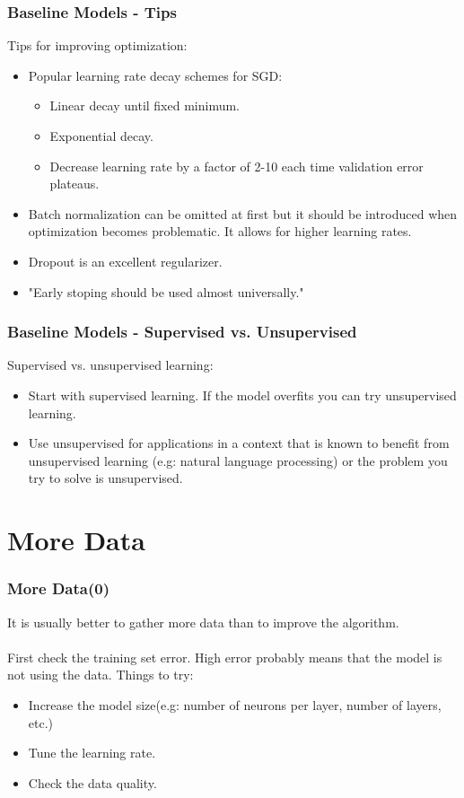 \documentclass{beamer}
\begin{document}
\begin{frame}
    \frametitle{Baseline Models - Tips}
    Tips for improving optimization:
    \begin{itemize}
        \item Popular learning rate decay schemes for SGD:
            \begin{itemize}
                \item Linear decay until fixed minimum.
                \item Exponential decay.
                \item Decrease learning rate by a factor of 2-10 each time 
                    validation error plateaus.
            \end{itemize}
        \item Batch normalization can be omitted at first but it should be
            introduced when optimization becomes problematic. It allows for higher
            learning rates.
        \item Dropout is an excellent regularizer.
        \item "Early stoping should be used almost universally."
            \cite{goodfellow-et-al-2016}
    \end{itemize}
\end{frame}

\begin{frame}
    \frametitle{Baseline Models - Supervised vs. Unsupervised}
    Supervised vs. unsupervised learning:
    \begin{itemize}
        \item Start with supervised learning. If the model overfits you can try
            unsupervised learning.
        \item Use unsupervised for applications in a context that is known to
            benefit from unsupervised learning (e.g: natural language processing)
            or the problem you try to solve is unsupervised.
    \end{itemize}
\end{frame}

\section{More Data}\label{sec:more-data}
\begin{frame}
    \frametitle{More Data(0)}
    It is usually better to gather more data than to improve the algorithm. \\~\\

    First check the training set error. High error probably means that the model is
    not using the data.
    Things to try:
    \begin{itemize}
        \item Increase the model size(e.g: number of neurons per layer, number of layers,
            etc.)
        \item Tune the learning rate.
        \item Check the data quality.
    \end{itemize}
\end{frame}
\end{document}
